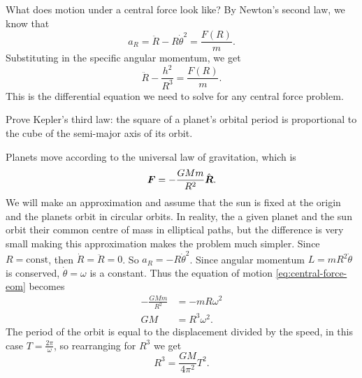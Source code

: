 \documentclass[../classical_mechanics.tex]{subfiles}
\begin{document}
        What does motion under a central force look like?
        By Newton's second law, we know that
        \begin{equation}\label{eq:central-force-eom}
            a_R=\ddot{R}-R\dot{\theta}^2=\frac{F(R)}{m}.
        \end{equation}
        Substituting in the specific angular momentum, we get
        \begin{equation}
            \ddot{R}-\frac{h^2}{R^3}=\frac{F(R)}{m}.
        \end{equation}
        This is the differential equation we need to solve for any central force problem.
        \begin{example}
            Prove Kepler's third law: the square of a planet's orbital period is proportional to the cube of the semi-major axis of its orbit.

            Planets move according to the universal law of gravitation, which is
            \begin{equation}
                \boldsymbol{F}=-\frac{GMm}{R^2}\hat{\boldsymbol{R}}.
            \end{equation}
            We will make an approximation and assume that the sun is fixed at the origin and the planets orbit in circular orbits.
            In reality, the a given planet and the sun orbit their common centre of mass in elliptical paths, but the difference is very small making this approximation makes the problem much simpler.
            Since $R=\text{const}$, then $\dot{R}=\ddot{R}=0$.
            So $a_R=-R\dot{\theta}^2$.
            Since angular momentum $L=mR^2\dot{\theta}$ is conserved, $\dot{\theta}=\omega$ is a constant.
            Thus the equation of motion \ref{eq:central-force-eom} becomes
            \begin{align}
                -\frac{GMm}{R^2}&=-mR\omega^2\\
                GM&=R^3\omega^2.
            \end{align}
            The period of the orbit is equal to the displacement divided by the speed, in this case $T=\frac{2\pi}{\omega}$, so rearranging for $R^3$ we get
            \begin{equation}
                R^3=\frac{GM}{4\pi^2}T^2.
            \end{equation}
        \end{example}
\end{document}
